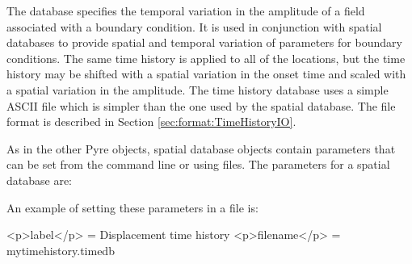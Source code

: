 The  database specifies the temporal variation in the
amplitude of a field associated with a boundary condition. It is used
in conjunction with spatial databases to provide spatial and temporal
variation of parameters for boundary conditions. The same time history
is applied to all of the locations, but the time history may be shifted
with a spatial variation in the onset time and scaled with a spatial
variation in the amplitude. The time history database uses a simple
ASCII file which is simpler than the one used by the  spatial
database. The file format is described in Section \vref{sec:format:TimeHistoryIO}. 

As in the other Pyre objects, spatial database objects contain parameters
that can be set from the command line or using 
files. The parameters for a spatial database are:
\begin{inventory}
\end{inventory}
An example of setting these parameters in a  file is:
\begin{cfg}
<p>label</p> = Displacement time history
<p>filename</p> = mytimehistory.timedb
\end{cfg}

